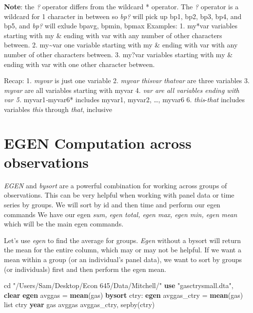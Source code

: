 \documentclass[
]{book}
\newenvironment{Shaded}{\begin{snugshade}}{\end{snugshade}}
\newcommand{\FunctionTok}[1]{\textcolor[rgb]{0.13,0.29,0.53}{\textbf{#1}}}
\newcommand{\KeywordTok}[1]{\textcolor[rgb]{0.13,0.29,0.53}{\textbf{#1}}}
\newcommand{\NormalTok}[1]{#1}
\newcommand{\OtherTok}[1]{\textcolor[rgb]{0.56,0.35,0.01}{#1}}
\newcommand{\StringTok}[1]{\textcolor[rgb]{0.31,0.60,0.02}{#1}}
\begin{document}
\textbf{Note}: the \emph{?} operator differs from the wildcard * operator. The \emph{?} operator is a wildcard for 1 character in between so \emph{bp?} will pick up bp1, bp2, bp3, bp4, and bp5, and \emph{bp?} will exlude bpavg, bpmin, bpmax
Examples:
1. my*var variables starting with my \& ending with var with any number of other characters between.
2. my\textasciitilde var one variable starting with my \& ending with var with any number of other characters between.
3. my?var variables starting with my \& ending with var with one other character between.

Recap:
1. \emph{myvar} is just one variable
2. \emph{myvar} \emph{thisvar} \emph{thatvar} are three variables
3. \emph{myvar} are all variables starting with myvar
4. \emph{var are all variables ending with var
5. }myvar1\emph{-}myvar6* includes myvar1, myvar2, \ldots, myvar6
6. \emph{this}-\emph{that} includes variables \emph{this} through \emph{that}, inclusive

\section{EGEN Computation across observations}\label{egen-computation-across-observations}

\emph{EGEN} and \emph{bysort} are a powerful combination for working across groups
of observations. This can be very helpful when working with panel
data or time series by groups. We will sort by id and then time and
perform our egen commands
We have our egen \emph{sum, egen total, egen max, egen min, egen mean} which will be the main egen commands.

Let's use \emph{egen} to find the average for groups. \emph{Egen} without a bysort will return the mean for the entire column, which may or may not be helpful. If we want a mean within a group (or an individual's panel data), we want to sort by groups (or individuals) first and then perform the egen mean.

\begin{Shaded}
\begin{Highlighting}[]
\NormalTok{cd }\StringTok{"/Users/Sam/Desktop/Econ 645/Data/Mitchell/"}
\KeywordTok{use} \StringTok{"gasctrysmall.dta"}\NormalTok{, }\KeywordTok{clear}
\KeywordTok{egen}\NormalTok{ avggas = }\KeywordTok{mean}\NormalTok{(gas)}
\KeywordTok{bysort}\NormalTok{ ctry: }\KeywordTok{egen}\NormalTok{ avggas\_ctry = }\KeywordTok{mean}\NormalTok{(gas)}
\OtherTok{list}\NormalTok{ ctry }\FunctionTok{year}\NormalTok{ gas avggas avggas\_ctry, sepby(ctry)}
\end{Highlighting}
\end{Shaded}
\end{document}
